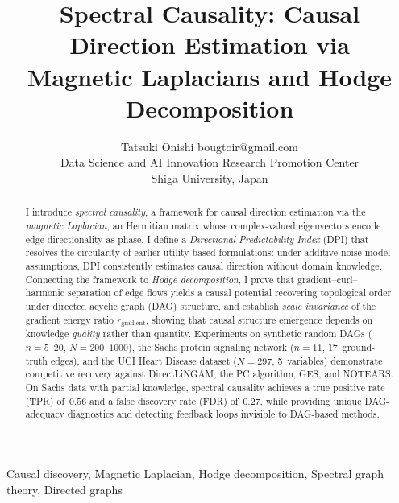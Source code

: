 \documentclass[twoside,11pt]{article}
\begin{document}
\title{Spectral Causality: Causal Direction Estimation via \\
Magnetic Laplacians and Hodge Decomposition}

\author{\name Tatsuki Onishi \email bougtoir@gmail.com \\
       \addr Data Science and AI Innovation Research Promotion Center \\
       Shiga University, Japan}


\maketitle

\begin{abstract}%
I introduce \emph{spectral causality}, a framework for causal direction
estimation via the \emph{magnetic Laplacian}, an Hermitian matrix whose
complex-valued eigenvectors encode edge directionality as phase.  I define
a \emph{Directional Predictability Index} (DPI) that resolves the
circularity of earlier utility-based formulations: under additive noise
model assumptions, DPI consistently estimates causal direction without
domain knowledge.  Connecting the framework to \emph{Hodge decomposition},
I prove that gradient--curl--harmonic separation of edge flows yields a
causal potential recovering topological order under directed acyclic graph
(DAG) structure, and establish \emph{scale invariance} of the gradient
energy ratio $r_{\mathrm{gradient}}$, showing that causal structure
emergence depends on knowledge \emph{quality} rather than quantity.
Experiments on synthetic random DAGs ($n{=}5$--$20$, $N{=}200$--$1000$),
the Sachs protein signaling network ($n{=}11$, 17~ground-truth edges),
and the UCI Heart Disease dataset ($N{=}297$, 5~variables) demonstrate
competitive recovery against DirectLiNGAM, the PC algorithm, GES, and
NOTEARS.  On Sachs data with partial knowledge, spectral causality achieves
a true positive rate (TPR) of~$0.56$ and a false discovery rate (FDR)
of~$0.27$, while providing unique DAG-adequacy diagnostics and detecting
feedback loops invisible to DAG-based methods.
\end{abstract}

\begin{keywords}
Causal discovery, Magnetic Laplacian, Hodge decomposition, Spectral graph theory, Directed graphs
\end{keywords}

\end{document}
